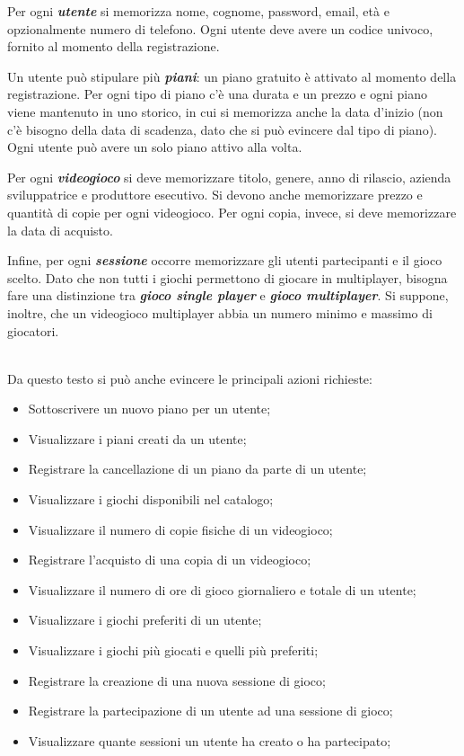 \documentclass[a4paper,12pt]{report}
\begin{document}
\begin{addmargin}[4em]{4em}
Per ogni \textbf{\textit{utente}} si memorizza nome, cognome, password, email, età e opzionalmente numero di telefono. Ogni utente deve avere un codice univoco, fornito al momento della registrazione.

Un utente può stipulare più \textbf{\textit{piani}}: un piano gratuito è attivato al momento della registrazione. Per ogni tipo di piano c'è una durata e un prezzo e ogni piano viene mantenuto in uno storico, in cui si memorizza anche la data d'inizio (non c'è bisogno della data di scadenza, dato che si può evincere dal tipo di piano). Ogni utente può avere un solo piano attivo alla volta.

Per ogni \textbf{\textit{videogioco}} si deve memorizzare titolo, genere, anno di rilascio, azienda sviluppatrice e produttore esecutivo. Si devono anche memorizzare prezzo e quantità di copie per ogni videogioco. Per ogni copia, invece, si deve memorizzare la data di acquisto.


Infine, per ogni \textbf{\textit{sessione}} occorre memorizzare gli utenti partecipanti e il gioco scelto. Dato che non tutti i giochi permettono di giocare in multiplayer, bisogna fare una distinzione tra \textbf{\textit{gioco single player}} e \textbf{\textit{gioco multiplayer}}. Si suppone, inoltre, che un videogioco multiplayer abbia un numero minimo e massimo di giocatori. \\\\

\end{addmargin}

Da questo testo si può anche evincere le principali azioni richieste:

\begin{itemize}
\item Sottoscrivere un nuovo piano per un utente;
\item Visualizzare i piani creati da un utente;
\item Registrare la cancellazione di un piano da parte di un utente;
\item Visualizzare i giochi disponibili nel catalogo;
\item Visualizzare il numero di copie fisiche di un videogioco;
\item Registrare l'acquisto di una copia di un videogioco;
\item Visualizzare il numero di ore di gioco giornaliero e totale di un utente;
\item Visualizzare i giochi preferiti di un utente;
\item Visualizzare i giochi più giocati e quelli più preferiti;
\item Registrare la creazione di una nuova sessione di gioco;
\item Registrare la partecipazione di un utente ad una sessione di gioco;
\item Visualizzare quante sessioni un utente ha creato o ha partecipato;
\end{itemize}
\end{document}
